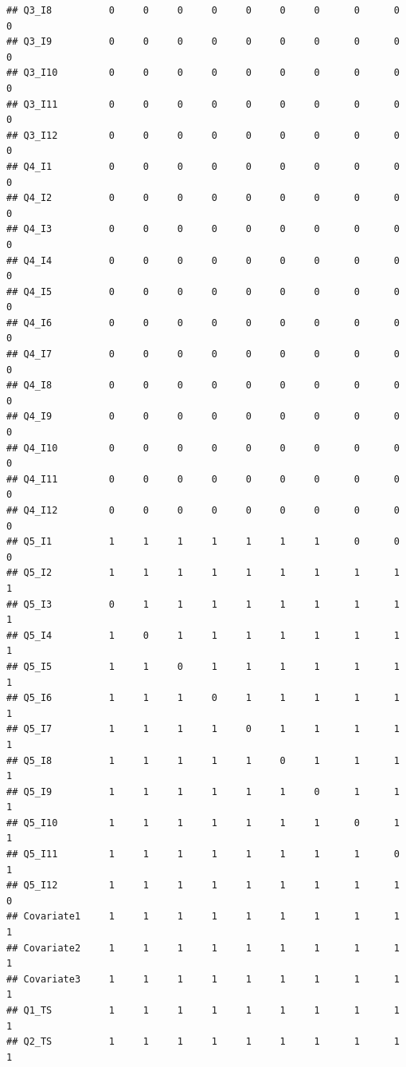 \documentclass[]{book}
\begin{document}
\begin{verbatim}
## Q3_I8          0     0     0     0     0     0     0      0      0      0
## Q3_I9          0     0     0     0     0     0     0      0      0      0
## Q3_I10         0     0     0     0     0     0     0      0      0      0
## Q3_I11         0     0     0     0     0     0     0      0      0      0
## Q3_I12         0     0     0     0     0     0     0      0      0      0
## Q4_I1          0     0     0     0     0     0     0      0      0      0
## Q4_I2          0     0     0     0     0     0     0      0      0      0
## Q4_I3          0     0     0     0     0     0     0      0      0      0
## Q4_I4          0     0     0     0     0     0     0      0      0      0
## Q4_I5          0     0     0     0     0     0     0      0      0      0
## Q4_I6          0     0     0     0     0     0     0      0      0      0
## Q4_I7          0     0     0     0     0     0     0      0      0      0
## Q4_I8          0     0     0     0     0     0     0      0      0      0
## Q4_I9          0     0     0     0     0     0     0      0      0      0
## Q4_I10         0     0     0     0     0     0     0      0      0      0
## Q4_I11         0     0     0     0     0     0     0      0      0      0
## Q4_I12         0     0     0     0     0     0     0      0      0      0
## Q5_I1          1     1     1     1     1     1     1      0      0      0
## Q5_I2          1     1     1     1     1     1     1      1      1      1
## Q5_I3          0     1     1     1     1     1     1      1      1      1
## Q5_I4          1     0     1     1     1     1     1      1      1      1
## Q5_I5          1     1     0     1     1     1     1      1      1      1
## Q5_I6          1     1     1     0     1     1     1      1      1      1
## Q5_I7          1     1     1     1     0     1     1      1      1      1
## Q5_I8          1     1     1     1     1     0     1      1      1      1
## Q5_I9          1     1     1     1     1     1     0      1      1      1
## Q5_I10         1     1     1     1     1     1     1      0      1      1
## Q5_I11         1     1     1     1     1     1     1      1      0      1
## Q5_I12         1     1     1     1     1     1     1      1      1      0
## Covariate1     1     1     1     1     1     1     1      1      1      1
## Covariate2     1     1     1     1     1     1     1      1      1      1
## Covariate3     1     1     1     1     1     1     1      1      1      1
## Q1_TS          1     1     1     1     1     1     1      1      1      1
## Q2_TS          1     1     1     1     1     1     1      1      1      1

\end{verbatim}
\end{document}
